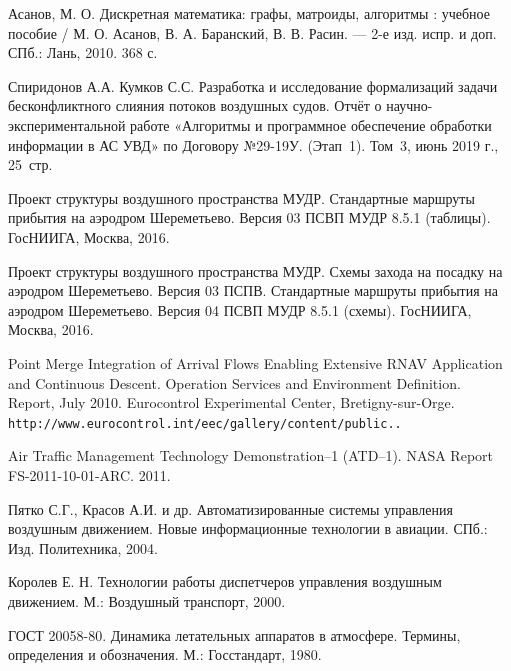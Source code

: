 \documentclass[12pt]{article}
\theoremstyle{plain}
\begin{document}
\begin{thebibliography}{9}

 Асанов, М. О. Дискретная математика: графы, матроиды, алгоритмы : учебное пособие / М. О. Асанов, В. А. Баранский, В. В. Расин. — 2-е изд. испр. и доп. СПб.: Лань, 2010. 368 с.

 Спиридонов А.А. Кумков С.С. Разработка и исследование формализаций задачи бесконфликтного слияния потоков воздушных судов. Отчёт о научно-экспериментальной работе «Алгоритмы и программное обеспечение обработки информации в АС УВД» по Договору №29-19У. (Этап~1). Том~3, июнь 2019 г., 25~стр.
 
 Проект структуры воздушного пространства МУДР. Стандартные маршруты прибытия на аэродром Шереметьево. Версия 03 ПСВП МУДР 8.5.1 (таблицы). ГосНИИГА, Москва, 2016.

 Проект структуры воздушного пространства МУДР. Схемы захода на посадку на аэродром Шереметьево. Версия 03 ПСПВ. Стандартные маршруты прибытия на аэродром Шереметьево. Версия 04 ПСВП МУДР 8.5.1 (схемы). ГосНИИГА, Москва, 2016.

 Point Merge Integration of Arrival Flows Enabling Extensive RNAV Application and Continuous Descent. Operation Services and Environment Definition. Report, July 2010. Eurocontrol Experimental Center, Bretigny-sur-Orge.\\
\texttt{http://www.eurocontrol.int/eec/gallery/content/public..}

 Air Traffic Management Technology Demonstration--1 (ATD--1). NASA Report FS-2011-10-01-ARC. 2011.

 Пятко С.Г., Красов А.И. и др. Автоматизированные системы управления воздушным движением. Новые информационные технологии в авиации. СПб.: Изд. Политехника, 2004.

 Королев Е. Н. Технологии работы диспетчеров управления воздушным движением. М.: Воздушный транспорт, 2000.

 ГОСТ 20058-80. Динамика летательных аппаратов в атмосфере. Термины, определения и обозначения. М.: Госстандарт, 1980.


\end{thebibliography}

\label{lastpage}
\end{document}
